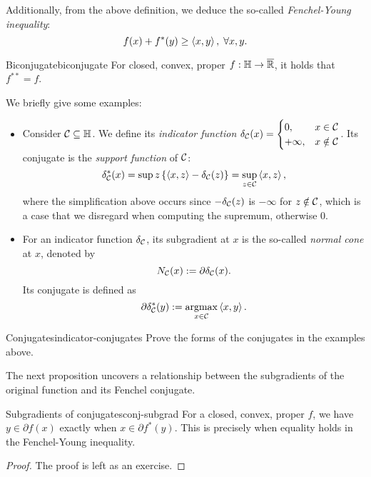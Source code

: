 Additionally, from the above definition, we deduce the so-called
\textit{Fenchel-Young inequality}:
\[
    f(x) + f^*(y) \geq \left\langle x, y \right\rangle, \; \forall x, y.
\]

\begin{ctheorem}{Biconjugate}{biconjugate}
    For closed, convex, proper $f: \mathbb{H} \to \overline{\mathbb{R}}$, it holds that
    $f^{**} = f$.
\end{ctheorem}

We briefly give some examples:
\begin{itemize}
\item Consider $\mathcal{C} \subseteq \mathbb{H}$. We define its \textit{indicator function}
    $\delta_{\mathcal{C}}(x) = \begin{cases}
        0, & x \in \mathcal{C} \\
        +\infty, & x \notin \mathcal{C}
    \end{cases}$. Its conjugate is the \textit{support function} of $\mathcal{C}$:
    \[
        \delta_{\mathcal{C}}^*(x) = \sup{z} \left\{ \left\langle x, z \right\rangle - \delta_{\mathcal{C}}(z) \right\}
        = \sup_{z \in \mathcal{C}} \left\langle x, z \right\rangle,
    \]
    where the simplification above occurs since $-\delta_{\mathcal{C}}(z)$ is $-\infty$
    for $z \notin \mathcal{C}$, which is a case that we disregard when computing the
    supremum, otherwise $0$.
\item For an indicator function $\delta_{\mathcal{C}}$, its subgradient at $x$ is the
    so-called \textit{normal cone} at $x$, denoted by
    \[
        N_{\mathcal{C}}(x) := \partial \delta_{\mathcal{C}}(x).
    \]
    Its conjugate is defined as
    \[
        \partial \delta_{\mathcal{C}}^*(y) := \operatorname*{argmax}_{x \in \mathcal{C}} \left\langle x, y \right\rangle.
    \]
\end{itemize}

\begin{exercise}{Conjugates}{indicator-conjugates}
    Prove the forms of the conjugates in the examples above.
\end{exercise}

The next proposition uncovers a relationship between the subgradients of the
original function and its Fenchel conjugate.
\begin{cproposition}{Subgradients of conjugates}{conj-subgrad}
    For a closed, convex, proper $f$, we have $y \in \partial f(x)$ exactly when
    $x \in \partial f^*(y)$. This is precisely when equality holds in the
    Fenchel-Young inequality.
\end{cproposition}
\begin{proof}
    The proof is left as an exercise.
\end{proof}

